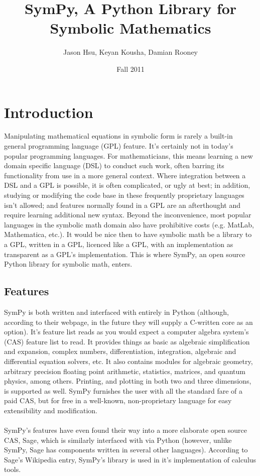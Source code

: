 \documentclass[11pt]{article}
\begin{document}
\title{SymPy, A Python Library for Symbolic Mathematics}
\author{Jason Hsu, Keyan Kousha, Damian Rooney}
\date{Fall 2011}
\maketitle
\section{Introduction}
Manipulating mathematical equations in symbolic form is rarely a built-in general programming language (GPL) feature. It's certainly not in today's popular programming languages. For mathematicians, this means learning a new domain specific language (DSL) to conduct such work, often barring its functionality from use in a more general context. Where integration between a DSL and a GPL is possible, it is often complicated, or ugly at best; in addition, studying or modifying the code base in these frequently proprietary languages isn't allowed; and features normally found in a GPL are an afterthought and require learning additional new syntax. Beyond the inconvenience, most popular languages in the symbolic math domain also have prohibitive costs (e.g. MatLab, Mathematica, etc.). It would be nice then to have symbolic math be a library to a GPL, written in a GPL, licenced like a GPL, with an implementation as transparent as a GPL's implementation. This is where SymPy, an open source Python library for symbolic math, enters.
\subsection{Features}
SymPy is both written and interfaced with entirely in Python (although, according to their webpage, in the future they will supply a C-written core as an option). It's feature list reads as you would expect a computer algebra system's (CAS) feature list to read. It provides things as basic as algebraic simplification and expansion, complex numbers, differentiation, integration, algebraic and differential equation solvers, etc. It also contains modules for algebraic geometry, arbitrary precision floating point arithmetic, statistics, matrices, and quantum physics, among others. Printing, and plotting in both two and three dimensions, is supported as well. SymPy furnishes the user with all the standard fare of a paid CAS, but for free in a well-known, non-proprietary language for easy extensibility and modification.\\\\
 SymPy's features have even found their way into a more elaborate open source CAS, Sage, which is similarly interfaced with via Python (however, unlike SymPy, Sage has components written in several other languages). According to Sage's Wikipedia entry, SymPy's library is used in it's implementation of calculus tools.
\end{document}
